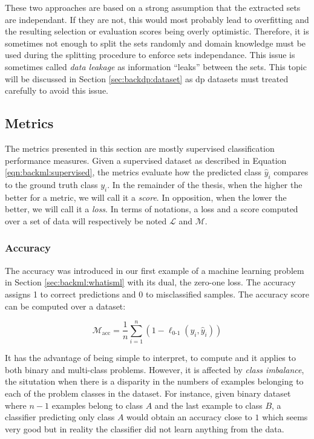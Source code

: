 These two approaches are based on a strong assumption that the extracted sets are independant. If they are not, this would most probably lead to overfitting and the resulting selection or evaluation scores being overly optimistic. Therefore, it is sometimes not enough to split the sets randomly and domain knowledge must be used during the splitting procedure to enforce sets independance. This issue is sometimes called \textit{data leakage} \parencite{kaufman2012leakage} as information ``leaks'' between the sets. This topic will be discussed in Section \ref{sec:backdp:dataset} as \acrlong{dp} datasets must treated carefully to avoid this issue. 

\subsection{Metrics}
\label{ssec:backml:metrics}

The metrics presented in this section are mostly supervised classification performance measures. Given a supervised dataset as described in Equation \ref{eqn:backml:supervised}, the metrics evaluate how the predicted class $\hat{y}_i$ compares to the ground truth class $y_i$. In the remainder of the thesis, when the higher the better for a metric, we will call it a \textit{score}. In opposition, when the lower the better, we will call it a \textit{loss}. In terms of notations, a loss and a score computed over a set of data will respectively be noted $\mathcal{L}$ and $\mathcal{M}$.

\subsubsection{Accuracy}
\label{sssec:backml:metric:acc}
The accuracy was introduced in our first example of a machine learning problem in Section \ref{sec:backml:whatisml} with its dual, the zero-one loss. The accuracy assigns 1 to correct predictions and 0 to misclassified samples. The accuracy score can be computed over a dataset:

\begin{equation}
\label{eqn:backml:accuracy}
\mathcal{M}_{\text{acc}} = \dfrac{1}{n} \sum\limits_{i = 1}^n (1 - \ell_{\text{0-1}}(y_i, \hat{y}_i))
\end{equation} 

It has the advantage of being simple to interpret, to compute and it applies to both binary and multi-class problems. However, it is affected by \textit{class imbalance}, the situtation when there is a disparity in the numbers of examples belonging to each of the problem classes in the dataset. For instance, given binary dataset where $n-1$ examples belong to class $A$ and the last example to class $B$, a classifier predicting only class $A$ would obtain an accuracy close to $1$ which seems very good but in reality the classifier did not learn anything from the data.      

